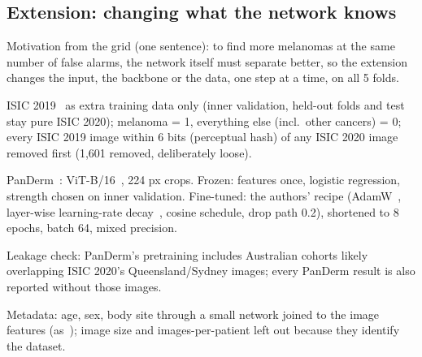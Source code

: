 \subsection{Extension: changing what the network knows}
\begin{notes}[~200 words]
  \item Motivation from the grid (one sentence): to find more melanomas at the same number of false alarms, the network itself must separate better, so the extension changes the input, the backbone or the data, one step at a time, on all 5 folds.
  \item ISIC 2019~\cite{tschandl2018ham10000,combalia2019bcn20000} as extra training data only (inner validation, held-out folds and test stay pure ISIC 2020); melanoma = 1, everything else (incl.\ other cancers) = 0; every ISIC 2019 image within 6 bits (perceptual hash) of any ISIC 2020 image removed first (1,601 removed, deliberately loose).
  \item PanDerm~\cite{yan2025panderm}: ViT-B/16~\cite{dosovitskiy2021image}, 224 px crops. Frozen: features once, logistic regression, strength chosen on inner validation. Fine-tuned: the authors' recipe (AdamW~\cite{loshchilov2019decoupled}, layer-wise learning-rate decay~\cite{bao2022beit}, cosine schedule, drop path 0.2), shortened to 8 epochs, batch 64, mixed precision.
  \item Leakage check: PanDerm's pretraining includes Australian cohorts likely overlapping ISIC 2020's Queensland/Sydney images; every PanDerm result is also reported without those images.
  \item Metadata: age, sex, body site through a small network joined to the image features (as~\cite{ha2020identifying}); image size and images-per-patient left out because they identify the dataset.
\end{notes}

